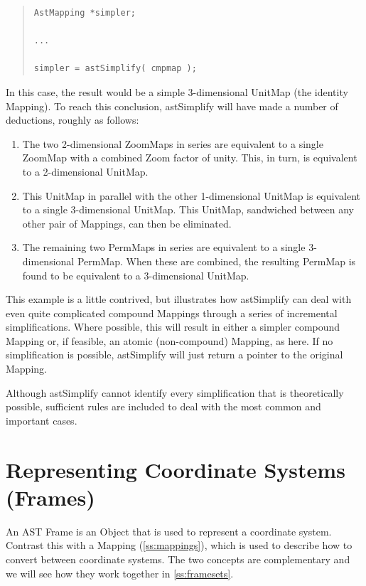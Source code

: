 \documentclass[twoside,11pt]{article}
\newcommand{\htmlref}[2]{#1}
\newcommand{\secref}[1]{\S\ref{#1}}
\renewcommand{\secref}[1]{\ref{#1}}
\begin{document}
\begin{quote}
\small
\begin{verbatim}
AstMapping *simpler;

...

simpler = astSimplify( cmpmap );
\end{verbatim}
\normalsize
\end{quote}

In this case, the result would be a simple 3-dimensional UnitMap (the
identity Mapping).  To reach this conclusion, astSimplify will have
made a number of deductions, roughly as follows:

\begin{enumerate}
\item The two 2-dimensional ZoomMaps in series are equivalent to a
single \htmlref{ZoomMap}{ZoomMap} with a combined \htmlref{Zoom}{Zoom} factor of unity. This, in turn, is
equivalent to a 2-dimensional UnitMap.

\item This UnitMap in parallel with the other 1-dimensional UnitMap is
equivalent to a single 3-dimensional UnitMap. This UnitMap, sandwiched
between any other pair of Mappings, can then be eliminated.

\item The remaining two PermMaps in series are equivalent to a single
3-dimensional \htmlref{PermMap}{PermMap}. When these are combined, the resulting PermMap
is found to be equivalent to a 3-dimensional UnitMap.
\end{enumerate}

This example is a little contrived, but illustrates how astSimplify
can deal with even quite complicated compound Mappings through a
series of incremental simplifications. Where possible, this will
result in either a simpler compound Mapping or, if feasible, an atomic
(non-compound) Mapping, as here. If no simplification is possible,
astSimplify will just return a pointer to the original Mapping.

Although astSimplify cannot identify every simplification that is
theoretically possible, sufficient rules are included to deal with the
most common and important cases.

\cleardoublepage
\section{\label{ss:frames}Representing Coordinate Systems (Frames)}

An AST \htmlref{Frame}{Frame} is an \htmlref{Object}{Object} that is used to represent a coordinate
system. Contrast this with a \htmlref{Mapping}{Mapping} (\secref{ss:mappings}), which is
used to describe how to convert between coordinate systems. The two
concepts are complementary and we will see how they work together in
\secref{ss:framesets}.
\end{document}
